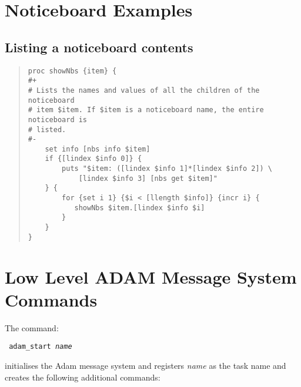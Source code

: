 \newpage
\section{\label{noticeboard_examples}Noticeboard Examples}

\subsection{\label{listing_notice_board_contents}Listing a noticeboard contents}

\begin{quote}
\begin{verbatim}
proc showNbs {item} {
#+
# Lists the names and values of all the children of the noticeboard
# item $item. If $item is a noticeboard name, the entire noticeboard is
# listed.
#-
    set info [nbs info $item]
    if {[lindex $info 0]} {
        puts "$item: ([lindex $info 1]*[lindex $info 2]) \
            [lindex $info 3] [nbs get $item]"
    } {
        for {set i 1} {$i < [llength $info]} {incr i} {
           showNbs $item.[lindex $info $i]
        }
    }
}
\end{verbatim}
\end{quote}

\newpage
\section{\label{low_level_adam_message_system_commands}Low Level ADAM Message System Commands}

The command:

\begin{tquote}{\tt
adam\_start {\em name}
}\end{tquote}

initialises the Adam message system and registers {\em name} as the task
name and creates the following additional commands:

